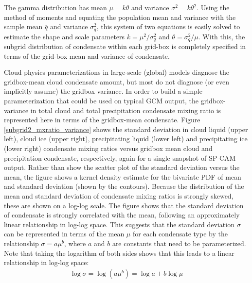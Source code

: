 The gamma distribution has mean $\mu = k\theta$ and variance $\sigma^2 = k \theta^2$. Using the method of moments \citep[e.g.,][]{wilks_2011} and equating the population mean and variance with the sample mean $\overline{q}$ and variance $\sigma_q^2$, this system of two equations is easily solved to estimate the shape and scale parameters $k = \mu^2 / \sigma_q^2$ and $\theta = \sigma_q^2 / \mu$. With this, the subgrid distribution of condensate within each grid-box is completely specified in terms of the grid-box mean and variance of condensate.

Cloud physics parameterizations in large-scale (global) models diagnose the gridbox-mean cloud condensate amount, but most do not diagnose (or even implicitly assume) the gridbox-variance. In order to build a simple parameterization that could be used on typical GCM output, the gridbox-variance in total cloud and total precipitation condensate mixing ratio is represented here in terms of the gridbox-mean condensate. Figure \ref{subgrid2_mxratio_variance} shows the standard deviation in cloud liquid (upper left), cloud ice (upper right), precipitating liquid (lower left) and precipitating ice (lower right) condensate mixing ratios versus gridbox mean cloud and precipitation condensate, respectively, again for a single snapshot of SP-CAM output. Rather than show the scatter plot of the standard deviation versus the mean, the figure shows a kernel density estimate for the bivariate PDF of mean and standard deviation (shown by the contours). Because the distribution of the mean and standard deviation of condensate mixing ratios is strongly skewed, these are shown on a log-log scale. The figure shows that the standard deviation of condensate is strongly correlated with the mean, following an approximately linear relationship in log-log space. This suggests that the standard deviation $\sigma$ can be represented in terms of the mean $\mu$ for each condensate type by the relationship $\sigma = a \mu^b$, where $a$ and $b$ are constants that need to be parameterized. Note that taking the logarithm of both sides shows that this leads to a linear relationship in log-log space:
\begin{gather}
    \log \sigma = \log(a \mu^b) = \log a + b\log \mu
\end{gather}
